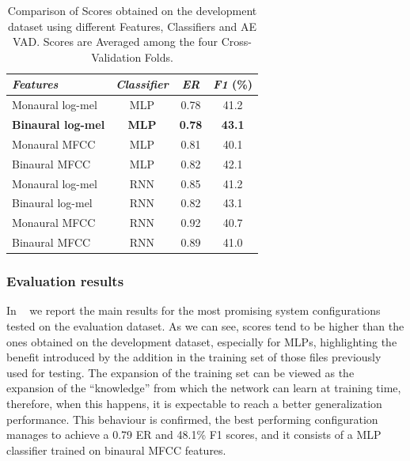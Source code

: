\begin{table}[h]
	\centering
	\begin{tabular}{l c c c}\toprule
		\emph{Features} & \emph{Classifier} & \emph{ER} & \emph{F1} (\%)\\
		\midrule
		Monaural log-mel & MLP & 0.78 & 41.2\\
		\textbf{Binaural log-mel} & \textbf{MLP} & \textbf{0.78} & \textbf{43.1}\\
		\midrule
		Monaural MFCC & MLP & 0.81 & 40.1\\
		Binaural MFCC & MLP & 0.82 & 42.1\\
		\midrule
		Monaural log-mel & RNN & 0.85 & 41.2\\
		Binaural log-mel & RNN & 0.82 & 43.1\\
		\midrule
		Monaural MFCC & RNN & 0.92 & 40.7\\
		Binaural MFCC & RNN & 0.89 & 41.0\\
		\bottomrule
	\end{tabular}
	\caption[Sound Event Detection - DCASE 2016 - Results]{Comparison of Scores obtained on the development dataset using different Features, Classifiers and AE VAD. Scores are Averaged among the four Cross-Validation Folds.}
	\label{tab:dev_results_ae}
\end{table}

\subsubsection{Evaluation results}

In ~ we report the main results for the most promising system configurations tested on the evaluation dataset. As we can see, scores tend to be higher than the ones obtained on the development dataset, especially for MLPs, highlighting the benefit introduced by the addition in the training set of those files previously used for testing. The expansion of the training set can be viewed as the expansion of the ``knowledge'' from which the network can learn at training time, therefore, when this happens, it is expectable to reach a better generalization performance. This behaviour is confirmed, the best performing configuration manages to achieve a 0.79 ER and 48.1\% F1 scores, and it consists of a MLP classifier trained on binaural MFCC features.

